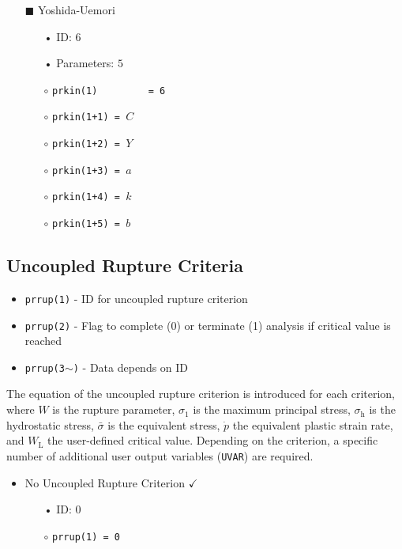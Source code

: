 \documentclass[11pt,a4paper,twoside,final,onecolumn,titlepage]{article}
\newcommand{\verified}{\hspace{0.5pt} {\LARGE $\checkmark$}}
\begin{document}
\begin{itemize}
	\item[\tiny$\blacksquare$] Yoshida-Uemori %
	\begin{itemize}
		\item[•] ID: $6$
		\item[•] Parameters: $5$\\
		\item[$\circ$] \texttt{prkin(1)\,\,\,\,\,\,\,\,\,= 6}
		\item[$\circ$] \texttt{prkin(1+1) = $C$}
		\item[$\circ$] \texttt{prkin(1+2) = $Y$}
		\item[$\circ$] \texttt{prkin(1+3) = $a$}
		\item[$\circ$] \texttt{prkin(1+4) = $k$}
		\item[$\circ$] \texttt{prkin(1+5) = $b$}
	\end{itemize}
\end{itemize}

\vspace{0.2cm}
\subsection{Uncoupled Rupture Criteria}
\vspace{0.2cm}

\begin{itemize}
	\item \texttt{prrup(1)} - ID for uncoupled rupture criterion
	\item \texttt{prrup(2)} - Flag to complete (0) or terminate (1) analysis if critical value is reached
	\item \texttt{prrup(3$\mathtt{\sim}$)} - Data depends on ID
\end{itemize}

\noindent The equation of the uncoupled rupture criterion is introduced for each criterion, where $W$ is the rupture parameter, $\sigma_{1}$ is the maximum principal stress, $\sigma_{\textrm{h}}$ is the hydrostatic stress, $\bar{\sigma}$ is the equivalent stress, $\dot{p}$ the equivalent plastic strain rate, and $W_\textrm{L}$ the user-defined critical value. Depending on the criterion, a specific number of additional user output variables (\texttt{UVAR}) are required.
\vspace{0.1cm}

\begin{itemize}
	\item No Uncoupled Rupture Criterion \verified{}
	\begin{itemize}
		\item[•] ID: $0$\\
		\item[$\circ$] \texttt{prrup(1) = 0}
	\end{itemize}
\end{itemize}
\end{document}
